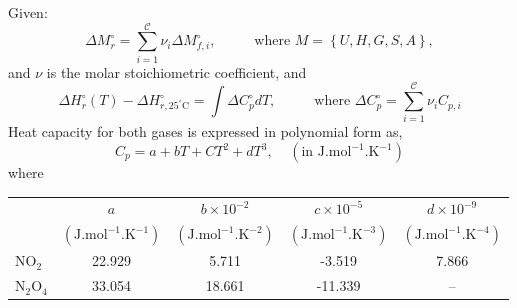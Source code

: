 \documentclass[calculator,allquestions,datasheet,mock,solutions]{exam_newMarcus2}
\newcommand{\summation}[3][error]{\sum\limits_{#2}^{#3}#1}
\begin{document}
\begin{question}
\begin{enumerate}[a)]
         Given:
         \begin{displaymath}
           \Delta M_{r}^{\circ} = \summation[\nu_{i}\Delta M_{f,i}^{\circ}]{i=1}{\mathcal{C}}, \hspace{1cm} \text{ where }M=\left\{U,H,G,S,A\right\}, 
         \end{displaymath}
         and $\nu$ is the molar stoichiometric coefficient, and
         \begin{displaymath}
            \Delta H_{r}^{\circ}(T) - \Delta H_{r,25^{\circ}\text{C}}^{\circ} = \int \Delta C_{p}^{\circ}dT, \hspace{1cm} \text{ where } \Delta C_{p}^{\circ} = \summation[\nu_{i}C_{p,i}]{i=1}{\mathcal{C}}
         \end{displaymath}
     Heat capacity for both gases is expressed in polynomial form as,
  \begin{displaymath}
    C_{p} = a + bT + CT^{2} + dT^{3}, \;\;\;\;\left(\text{in J.mol}^{-1}\text{.K}^{-1}\right)
  \end{displaymath}
  where
  \begin{center}
    \begin{tabular}{ l | c c c c }
      \hline
                         &  $a$     &  $b\times 10^{-2}$  & $c\times 10^{-5}$  & $d\times 10^{-9}$ \\
                         &$\left(\text{J.mol}^{-1}\text{.K}^{-1}\right)$& $\left(\text{J.mol}^{-1}\text{.K}^{-2}\right)$& $\left(\text{J.mol}^{-1}\text{.K}^{-3}\right)$& $\left(\text{J.mol}^{-1}\text{.K}^{-4}\right)$ \\
      \hline
      NO$_{2}$             &  22.929 &      5.711          & -3.519            & 7.866 \\
      N$_{2}$O$_{4}$       &   33.054 &      18.661         &    -11.339        &  -- 
    \end{tabular}
  \end{center}
  \end{enumerate}
  
\end{question}

\clearpage
\end{document}
